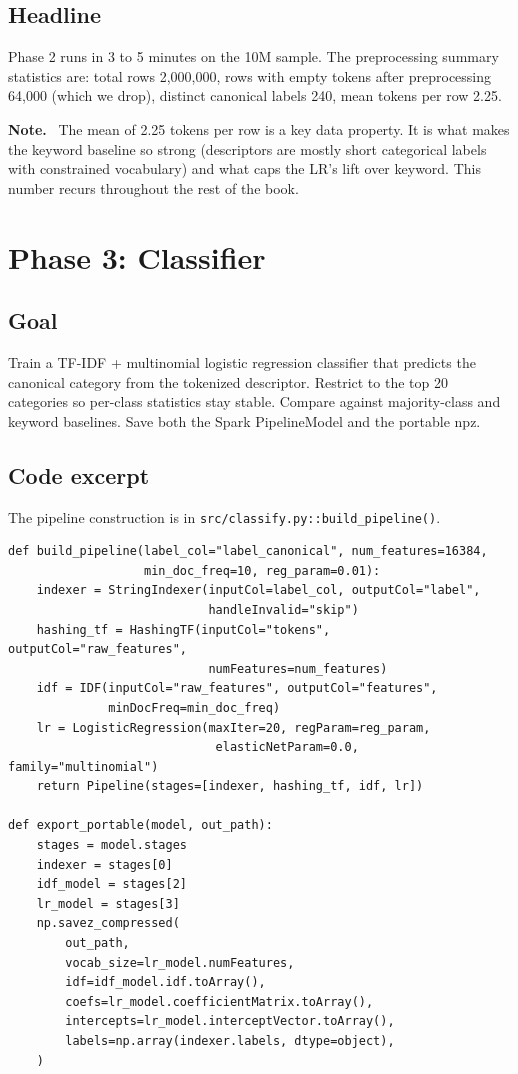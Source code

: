 \documentclass[11pt,letterpaper]{book}
\newenvironment{notebox}{\begin{framed}\textbf{Note.}~}{\end{framed}}
\begin{document}
\subsection*{Headline}

Phase 2 runs in 3 to 5 minutes on the 10M sample. The preprocessing summary statistics are: total rows 2,000,000, rows with empty tokens after preprocessing 64,000 (which we drop), distinct canonical labels 240, mean tokens per row 2.25.

\begin{notebox}
The mean of 2.25 tokens per row is a key data property. It is what makes the keyword baseline so strong (descriptors are mostly short categorical labels with constrained vocabulary) and what caps the LR's lift over keyword. This number recurs throughout the rest of the book.
\end{notebox}

\section{Phase 3: Classifier}
\label{sec:phase3}

\subsection*{Goal}

Train a TF-IDF + multinomial logistic regression classifier that predicts the canonical category from the tokenized descriptor. Restrict to the top 20 categories so per-class statistics stay stable. Compare against majority-class and keyword baselines. Save both the Spark PipelineModel and the portable npz.

\subsection*{Code excerpt}

The pipeline construction is in \texttt{src/classify.py::build\_pipeline()}.

\begin{lstlisting}
def build_pipeline(label_col="label_canonical", num_features=16384,
                   min_doc_freq=10, reg_param=0.01):
    indexer = StringIndexer(inputCol=label_col, outputCol="label",
                            handleInvalid="skip")
    hashing_tf = HashingTF(inputCol="tokens", outputCol="raw_features",
                            numFeatures=num_features)
    idf = IDF(inputCol="raw_features", outputCol="features",
              minDocFreq=min_doc_freq)
    lr = LogisticRegression(maxIter=20, regParam=reg_param,
                             elasticNetParam=0.0, family="multinomial")
    return Pipeline(stages=[indexer, hashing_tf, idf, lr])

def export_portable(model, out_path):
    stages = model.stages
    indexer = stages[0]
    idf_model = stages[2]
    lr_model = stages[3]
    np.savez_compressed(
        out_path,
        vocab_size=lr_model.numFeatures,
        idf=idf_model.idf.toArray(),
        coefs=lr_model.coefficientMatrix.toArray(),
        intercepts=lr_model.interceptVector.toArray(),
        labels=np.array(indexer.labels, dtype=object),
    )
\end{lstlisting}
\end{document}
